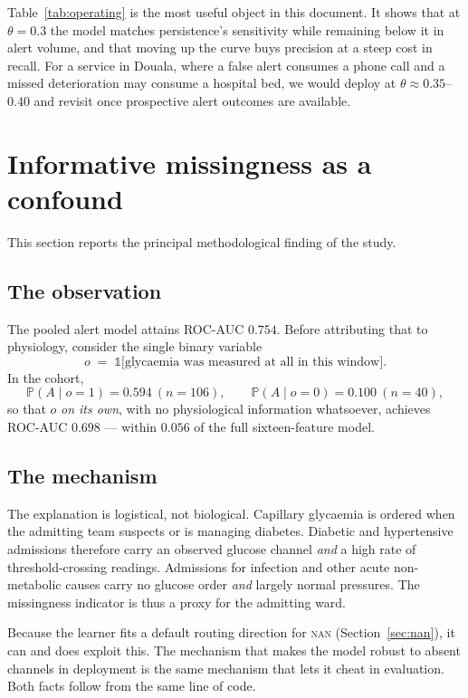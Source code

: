 \documentclass[11pt,a4paper]{article}
\newcommand{\Prob}{\mathbb{P}}
\begin{document}
Table~\ref{tab:operating} is the most useful object in this document. It shows
that at $\theta=0.3$ the model matches persistence's sensitivity while remaining
below it in alert volume, and that moving up the curve buys precision at a steep
cost in recall. For a service in Douala, where a false alert consumes a phone call
and a missed deterioration may consume a hospital bed, we would deploy at
$\theta\approx 0.35$--$0.40$ and revisit once prospective alert outcomes are
available.

\section{Informative missingness as a confound}
\label{sec:confound}

This section reports the principal methodological finding of the study.

\subsection{The observation}

The pooled alert model attains ROC-AUC $0.754$. Before attributing that to
physiology, consider the single binary variable
\[
  o \;=\; \mathbb{1}\bigl[\text{glycaemia was measured at all in this window}\bigr].
\]
In the cohort,
\[
  \Prob(A \mid o=1) = 0.594 \ (n=106),
  \qquad
  \Prob(A \mid o=0) = 0.100 \ (n=40),
\]
so that $o$ \emph{on its own}, with no physiological information whatsoever,
achieves ROC-AUC $0.698$ --- within $0.056$ of the full sixteen-feature model.

\subsection{The mechanism}

The explanation is logistical, not biological. Capillary glycaemia is ordered when
the admitting team suspects or is managing diabetes. Diabetic and hypertensive
admissions therefore carry an observed glucose channel \emph{and} a high rate of
threshold-crossing readings. Admissions for infection and other acute non-metabolic
causes carry no glucose order \emph{and} largely normal pressures. The missingness
indicator is thus a proxy for the admitting ward.

Because the learner fits a default routing direction for \textsc{nan}
(Section~\ref{sec:nan}), it can and does exploit this. The mechanism that makes the
model robust to absent channels in deployment is the same mechanism that lets it
cheat in evaluation. Both facts follow from the same line of code.
\end{document}
